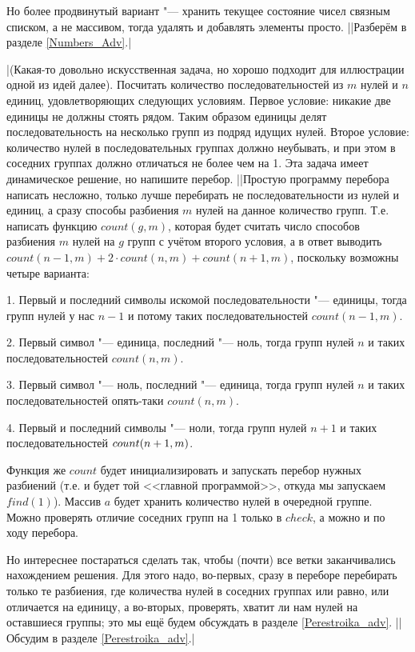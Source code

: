 Но более продвинутый вариант "--- хранить текущее состояние чисел связным списком, а не массивом, тогда удалять и добавлять элементы просто.
||Разберём в разделе \ref{Numbers_Adv}.|\label{Numbers_simple}

\task|(Какая-то довольно искусственная задача, но хорошо подходит для иллюстрации одной из идей далее). Посчитать количество последовательностей из $m$ нулей и $n$ единиц, удовлетворяющих следующих условиям. Первое условие: никакие две единицы не должны стоять рядом. Таким образом единицы делят последовательность на несколько групп из подряд идущих нулей. Второе условие: количество нулей в последовательных группах должно неубывать, и при этом в соседних группах должно отличаться не более чем на 1. Эта задача имеет динамическое решение, но напишите перебор.
||Простую программу перебора написать несложно, только лучше перебирать не последовательности из 
нулей и единиц, а сразу способы разбиения $m$ нулей на данное количество групп. Т.е. написать функцию $count(g,m)$, которая 
будет считать число способов разбиения $m$ нулей на $g$ групп с учётом второго условия, а в ответ выводить 
$count(n-1,m)+2\cdot count(n,m)+count(n+1,m)$, поскольку возможны четыре варианта:\par
1. Первый и последний символы искомой последовательности "--- единицы, тогда групп нулей у нас $n-1$ и потому таких последовательностей $count(n-1,m)$.\par
2. Первый символ "--- единица, последний "--- ноль, тогда групп нулей $n$ и таких последовательностей $count(n,m)$.\par
3. Первый символ "--- ноль, последний "--- единица, тогда групп нулей $n$ и таких последовательностей опять-таки $count(n,m)$.\par
4. Первый и последний символы "--- ноли, тогда групп нулей $n+1$ и таких последовательностей $count(n\hm+1,m)$.\par
Функция же $count$ будет инициализировать и запускать перебор нужных разбиений (т.е. и будет той <<главной программой>>, откуда мы запускаем $find(1)$). Массив $a$ будет хранить количество нулей в очередной группе. Можно проверять отличие соседних групп на 1 только в $check$, а можно и по ходу перебора.

Но интереснее постараться сделать так, чтобы (почти) все ветки заканчивались нахождением 
решения. Для этого надо, во-первых, сразу в переборе перебирать только те разбиения, где 
количества нулей в соседних группах или равно, или отличается на единицу, а во-вторых, 
проверять, хватит ли нам нулей на оставшиеся группы; это мы ещё будем обсуждать в разделе \ref{Perestroika_adv}.
||Обсудим в разделе \ref{Perestroika_adv}.|\label{Perestroika_simple}